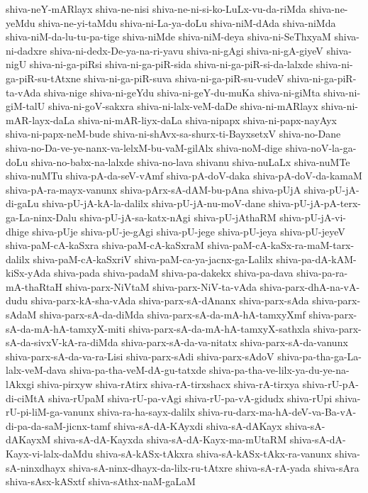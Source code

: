 {shiva-neY-mARlayx
shiva-ne-nisi
shiva-ne-ni-si-ko-LuLx-vu-da-riMda
shiva-ne-yeMdu
shiva-ne-yi-taMdu
shiva-ni-La-ya-doLu
shiva-niM-dAda
shiva-niMda
shiva-niM-da-lu-tu-pa-tige
shiva-niMde
shiva-niM-deya
shiva-ni-SeThxyaM
shiva-ni-dadxre
shiva-ni-dedx-De-ya-na-ri-yavu
shiva-ni-gAgi
shiva-ni-gA-giyeV
shiva-nigU
shiva-ni-ga-piRsi
shiva-ni-ga-piR-sida
shiva-ni-ga-piR-si-da-lalxde
shiva-ni-ga-piR-su-tAtxne
shiva-ni-ga-piR-suva
shiva-ni-ga-piR-su-vudeV
shiva-ni-ga-piR-ta-vAda
shiva-nige
shiva-ni-geYdu
shiva-ni-geY-du-muKa
shiva-ni-giMta
shiva-ni-giM-talU
shiva-ni-goV-sakxra
shiva-ni-lalx-veM-daDe
shiva-ni-mARlayx
shiva-ni-mAR-layx-daLa
shiva-ni-mAR-liyx-daLa
shiva-nipapx
shiva-ni-papx-nayAyx
shiva-ni-papx-neM-bude
shiva-ni-shAvx-sa-shurx-ti-BayxsetxV
shiva-no-Dane
shiva-no-Da-ve-ye-nanx-va-lelxM-bu-vaM-gilAlx
shiva-noM-dige
shiva-noV-la-ga-doLu
shiva-no-babx-na-lalxde
shiva-no-lava
shivanu
shiva-nuLaLx
shiva-nuMTe
shiva-nuMTu
shiva-pA-da-seV-vAmf
shiva-pA-doV-daka
shiva-pA-doV-da-kamaM
shiva-pA-ra-mayx-vanunx
shiva-pArx-sA-dAM-bu-pAna
shiva-pUjA
shiva-pU-jA-di-gaLu
shiva-pU-jA-kA-la-dalilx
shiva-pU-jA-nu-moV-dane
shiva-pU-jA-pA-terx-ga-La-ninx-Dalu
shiva-pU-jA-sa-katx-nAgi
shiva-pU-jAthaRM
shiva-pU-jA-vi-dhige
shiva-pUje
shiva-pU-je-gAgi
shiva-pU-jege
shiva-pU-jeya
shiva-pU-jeyeV
shiva-paM-cA-kaSxra
shiva-paM-cA-kaSxraM
shiva-paM-cA-kaSx-ra-maM-tarx-dalilx
shiva-paM-cA-kaSxriV
shiva-paM-ca-ya-jacnx-ga-Lalilx
shiva-pa-dA-kAM-kiSx-yAda
shiva-pada
shiva-padaM
shiva-pa-dakekx
shiva-pa-dava
shiva-pa-ra-mA-thaRtaH
shiva-parx-NiVtaM
shiva-parx-NiV-ta-vAda
shiva-parx-dhA-na-vA-dudu
shiva-parx-kA-sha-vAda
shiva-parx-sA-dAnanx
shiva-parx-sAda
shiva-parx-sAdaM
shiva-parx-sA-da-diMda
shiva-parx-sA-da-mA-hA-tamxyXmf
shiva-parx-sA-da-mA-hA-tamxyX-miti
shiva-parx-sA-da-mA-hA-tamxyX-sathxla
shiva-parx-sA-da-sivxV-kA-ra-diMda
shiva-parx-sA-da-va-nitatx
shiva-parx-sA-da-vanunx
shiva-parx-sA-da-va-ra-Lisi
shiva-parx-sAdi
shiva-parx-sAdoV
shiva-pa-tha-ga-La-lalx-veM-dava
shiva-pa-tha-veM-dA-gu-tatxde
shiva-pa-tha-ve-lilx-ya-du-ye-na-lAkxgi
shiva-pirxyw
shiva-rAtirx
shiva-rA-tirxshacx
shiva-rA-tirxya
shiva-rU-pA-di-ciMtA
shiva-rUpaM
shiva-rU-pa-vAgi
shiva-rU-pa-vA-gidudx
shiva-rUpi
shiva-rU-pi-liM-ga-vanunx
shiva-ra-ha-sayx-dalilx
shiva-ru-darx-ma-hA-deV-va-Ba-vA-di-pa-da-saM-jicnx-tamf
shiva-sA-dA-KAyxdi
shiva-sA-dAKayx
shiva-sA-dAKayxM
shiva-sA-dA-Kayxda
shiva-sA-dA-Kayx-ma-mUtaRM
shiva-sA-dA-Kayx-vi-lalx-daMdu
shiva-sA-kASx-tAkxra
shiva-sA-kASx-tAkx-ra-vanunx
shiva-sA-ninxdhayx
shiva-sA-ninx-dhayx-da-lilx-ru-tAtxre
shiva-sA-rA-yada
shiva-sAra
shiva-sAsx-kASxtf
shiva-sAthx-naM-gaLaM
}
